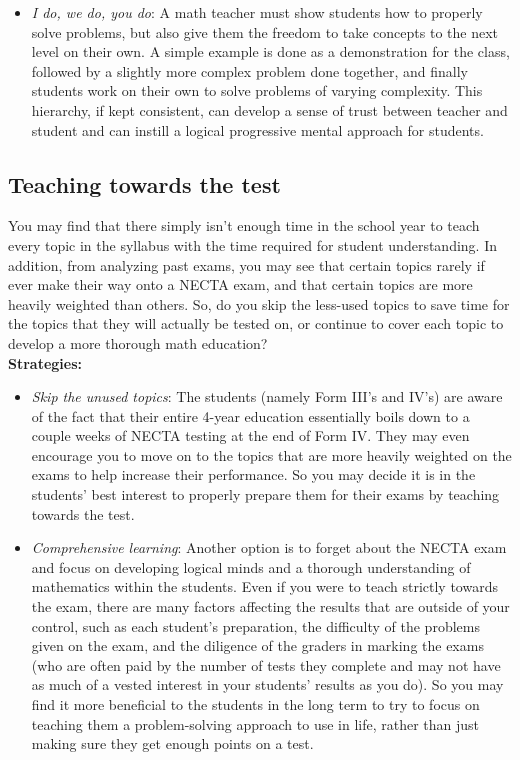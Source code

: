\begin{itemize}
\item\emph{I do, we do, you do}: A math teacher must show students how to properly solve problems, but also give them the freedom to take concepts to the next level on their own. A simple example is done as a demonstration for the class, followed by a slightly more complex problem done together, and finally students work on their own to solve problems of varying complexity. This hierarchy, if kept consistent, can develop a sense of trust between teacher and student and can instill a logical progressive mental approach for students.
\end{itemize}

\subsection{Teaching towards the test}
You may find that there simply isn't enough time in the school year to teach every topic in the syllabus with the time required for student understanding. In addition, from analyzing past exams, you may see that certain topics rarely if ever make their way onto a NECTA exam, and that certain topics are more heavily weighted than others. So, do you skip the less-used topics to save time for the topics that they will actually be tested on, or continue to cover each topic to develop a more thorough math education?\\

\textbf{Strategies:}
\begin{itemize}
\item\emph{Skip the unused topics}: The students (namely Form III's and IV's) are aware of the fact that their entire 4-year education essentially boils down to a couple weeks of NECTA testing at the end of Form IV. They may even encourage you to move on to the topics that are more heavily weighted on the exams to help increase their performance. So you may decide it is in the students' best interest to properly prepare them for their exams by teaching towards the test.

\item\emph{Comprehensive learning}: Another option is to forget about the NECTA exam and focus on developing logical minds and a thorough understanding of mathematics within the students. Even if you were to teach strictly towards the exam, there are many factors affecting the results that are outside of your control, such as each student's preparation, the difficulty of the problems given on the exam, and the diligence of the graders in marking the exams (who are often paid by the number of tests they complete and may not have as much of a vested interest in your students' results as you do). So you may find it more beneficial to the students in the long term to try to focus on teaching them a problem-solving approach to use in life, rather than just making sure they get enough points on a test.
\end{itemize}


